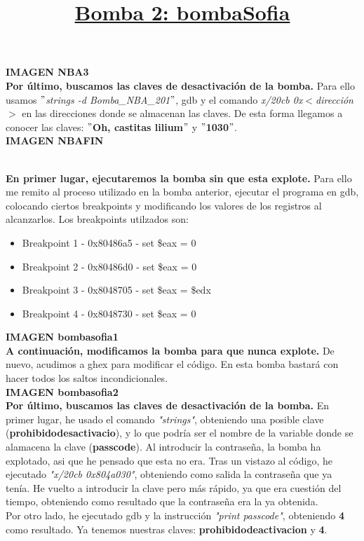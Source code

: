 \documentclass[11pt,a4paper]{article}
\begin{document}
\textbf{IMAGEN NBA3} \\

\textbf{Por último, buscamos las claves de desactivación de la bomba.} Para ello usamos \emph{$"$strings -d Bomba\_NBA\_201$"$}, gdb y el comando \emph{x/20cb 0x$<$dirección$>$} en las direcciones donde se almacenan las claves. De esta forma llegamos a conocer las claves: \textbf{$"$Oh, castitas lilium$"$} y \textbf{$"$1030$"$}. \\

\textbf{IMAGEN NBAFIN} \\

\title{\large{\textbf{\underline{Bomba 2: bombaSofia}}}} \\

\textbf{En primer lugar, ejecutaremos la bomba sin que esta explote.} Para ello me remito al proceso utilizado en la bomba anterior, ejecutar el programa en gdb, colocando ciertos breakpoints y modificando los valores de los registros al alcanzarlos. Los breakpoints utilzados son:

\begin{itemize}
	\item Breakpoint 1 - 0x80486a5 - set \$eax = 0
	\item Breakpoint 2 - 0x80486d0 - set \$eax = 0
	\item Breakpoint 3 - 0x8048705 - set \$eax = \$edx
	\item Breakpoint 4 - 0x8048730 - set \$eax = 0
\end{itemize}

\textbf{IMAGEN bombasofia1} \\

\textbf{A continuación, modificamos la bomba para que nunca explote.} De nuevo, acudimos a ghex para modificar el código. En esta bomba bastará con hacer todos los saltos incondicionales. \\

\textbf{IMAGEN bombasofia2} \\

\textbf{Por último, buscamos las claves de desactivación de la bomba.} En primer lugar, he usado el comando \emph{"strings"}, obteniendo una posible clave (\textbf{prohibidodesactivacio}), y lo que podría ser el nombre de la variable donde se alamacena la clave (\textbf{passcode}). Al introducir la contraseña, la bomba ha explotado, asi que he pensado que esta no era. 
Tras un vistazo al código, he ejecutado \emph{"x/20cb 0x804a030"}, obteniendo como salida la contraseña que ya tenía. He vuelto a introducir la clave pero más rápido, ya que era cuestión del tiempo, obteniendo como resultado que la contraseña era la ya obtenida. \\
Por otro lado, he ejecutado gdb y la instrucción \emph{"print passcode"}, obteniendo \textbf{4} como resultado. Ya tenemos nuestras claves: \textbf{prohibidodeactivacion} y \textbf{4}. \\
\end{document}
